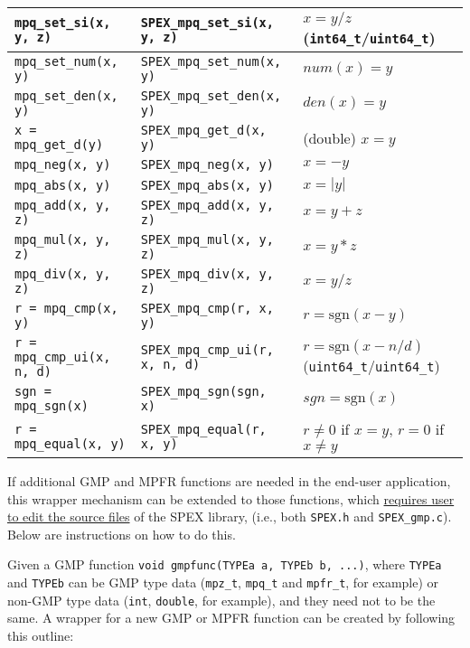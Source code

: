 \documentclass[12pt,oneside]{book}
\theoremstyle{definition}
\newenvironment{SizedCenteredTabular}[2][\small]
    {   
        #1\begin{center}\begin{tabular}{#2}
    }{ 
        \end{tabular}\end{center}
    }
\begin{document}
\begin{SizedCenteredTabular}[\scriptsize]{|l|l|l|}
\verb|mpq_set_si(x, y, z)|
    & \verb|SPEX_mpq_set_si(x, y, z)|
    & $x = y/z$ (\verb|int64_t|/\verb|uint64_t|) \\ \hline
\verb|mpq_set_num(x, y)|
    & \verb|SPEX_mpq_set_num(x, y)|
    & $num(x) = y$ \\ \hline
\verb|mpq_set_den(x, y)|
    & \verb|SPEX_mpq_set_den(x, y)|
    & $den(x) = y$ \\ \hline
\verb|x = mpq_get_d(y)|
    & \verb|SPEX_mpq_get_d(x, y)|
    & (double) $x = y$ \\ \hline
\verb|mpq_neg(x, y)|
    & \verb|SPEX_mpq_neg(x, y)|
    & $x = -y$ \\ \hline
\verb|mpq_abs(x, y)|
    & \verb|SPEX_mpq_abs(x, y)|
    & $x = |y|$ \\ \hline
\verb|mpq_add(x, y, z)|
    & \verb|SPEX_mpq_add(x, y, z)|
    & $x = y+z$ \\ \hline
\verb|mpq_mul(x, y, z)|
    & \verb|SPEX_mpq_mul(x, y, z)|
    & $x = y*z$ \\ \hline
\verb|mpq_div(x, y, z)|
    & \verb|SPEX_mpq_div(x, y, z)|
    & $x = y/z$ \\ \hline
\verb|r = mpq_cmp(x, y)|
    & \verb|SPEX_mpq_cmp(r, x, y)|
    & $r = \text{sgn}(x-y)$ \\ \hline
\verb|r = mpq_cmp_ui(x, n, d)|
    & \verb|SPEX_mpq_cmp_ui(r, x, n, d)|
    & $r = \text{sgn}(x-n/d)$ (\verb|uint64_t|/\verb|uint64_t|)  \\ \hline
\verb|sgn = mpq_sgn(x)|
    & \verb|SPEX_mpq_sgn(sgn, x)|
    & $sgn = \text{sgn}(x)$ \\ \hline
\verb|r = mpq_equal(x, y)|
    & \verb|SPEX_mpq_equal(r, x, y)|
    & $r \neq 0$ if $x=y$,  $r= 0$ if $x\neq y$ \\ \hline
\end{SizedCenteredTabular}


If additional GMP and MPFR functions are needed in the end-user application,
this wrapper mechanism can be extended to those functions, which \ul{requires user to edit the source files} of the SPEX library, (i.e., both \verb|SPEX.h| and \verb|SPEX_gmp.c|).  Below are
instructions on how to do this.

Given a GMP function \verb|void gmpfunc(TYPEa a, TYPEb b, ...)|, where
\verb|TYPEa| and \verb|TYPEb| can be GMP type data (\verb|mpz_t|,
\verb|mpq_t| and \verb|mpfr_t|, for example) or non-GMP type data (\verb|int|,
\verb|double|, for example), and they need not to be the same.
\pagebreak
A wrapper for a new GMP or MPFR function can be created by following
this outline:
\end{document}
